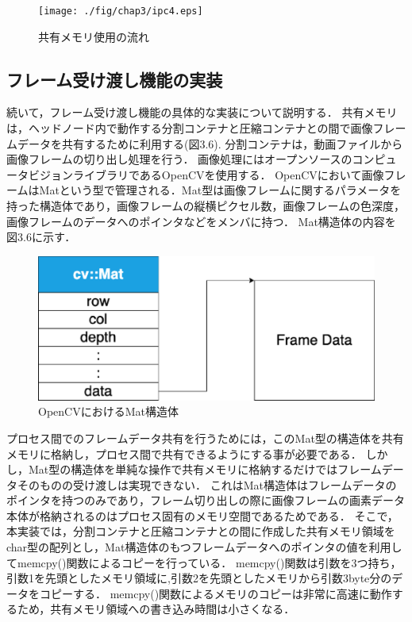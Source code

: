 \begin{figure}[H]
    \hspace*{\fill}
    \texttt{[image: ./fig/chap3/ipc4.eps]}
    \hspace*{\fill}
    \caption{共有メモリ使用の流れ}
\end{figure}


\subsection*{フレーム受け渡し機能の実装}

続いて，フレーム受け渡し機能の具体的な実装について説明する．
共有メモリは，ヘッドノード内で動作する分割コンテナと圧縮コンテナとの間で画像フレームデータを共有するために利用する(図3.6).
分割コンテナは，動画ファイルから画像フレームの切り出し処理を行う．
画像処理にはオープンソースのコンピュータビジョンライブラリであるOpenCVを使用する．
OpenCVにおいて画像フレームはMatという型で管理される．Mat型は画像フレームに関するパラメータを持った構造体であり，画像フレームの縦横ピクセル数，画像フレームの色深度，画像フレームのデータへのポインタなどをメンバに持つ．
Mat構造体の内容を図3.6に示す．

\begin{figure}[H]
    \hspace*{\fill}
    \includegraphics[width=\linewidth]{./fig/chap3/mat.eps}
    \hspace*{\fill}
    \caption{OpenCVにおけるMat構造体}
\end{figure}

プロセス間でのフレームデータ共有を行うためには，このMat型の構造体を共有メモリに格納し，プロセス間で共有できるようにする事が必要である．
しかし，Mat型の構造体を単純な操作で共有メモリに格納するだけではフレームデータそのものの受け渡しは実現できない．
これはMat構造体はフレームデータのポインタを持つのみであり，フレーム切り出しの際に画像フレームの画素データ本体が格納されるのはプロセス固有のメモリ空間であるためである．
そこで，本実装では，分割コンテナと圧縮コンテナとの間に作成した共有メモリ領域をchar型の配列とし，Mat構造体のもつフレームデータへのポインタの値を利用してmemcpy()関数によるコピーを行っている．
memcpy()関数は引数を3つ持ち，引数1を先頭としたメモリ領域に,引数2を先頭としたメモリから引数3byte分のデータをコピーする．
memcpy()関数によるメモリのコピーは非常に高速に動作するため，共有メモリ領域への書き込み時間は小さくなる．

